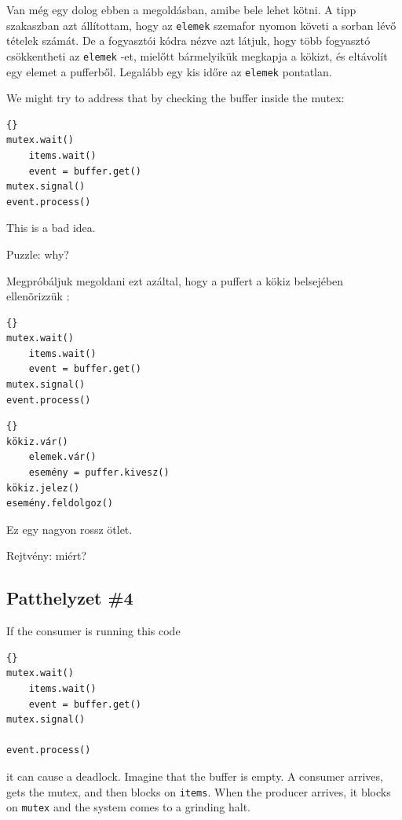 \documentclass{book}
\newcommand{\clearemptydoublepage}{\newpage\cleardoublepage}
\begin{document}
Van még egy dolog ebben a megoldásban, amibe bele lehet kötni.
A tipp szakaszban azt állítottam, hogy az {\tt elemek} szemafor nyomon követi a sorban lévő tételek számát.
De a fogyasztói kódra nézve azt látjuk, hogy több fogyasztó
csökkentheti az {\tt elemek} -et, mielőtt bármelyikük megkapja a kökizt,
és eltávolít egy elemet a pufferből. Legalább egy kis időre az {\tt elemek} pontatlan.

We might try to address that by checking the buffer inside the
mutex:

\begin{lstlisting}[title={Broken consumer solution}]{}
mutex.wait()
    items.wait()
    event = buffer.get()
mutex.signal()
event.process()
\end{lstlisting}

This is a bad idea.

Puzzle: why?

Megpróbáljuk megoldani ezt azáltal, hogy a puffert a kökiz belsejében ellenõrizzük :

\begin{lstlisting}[title={Broken consumer solution}]{}
mutex.wait()
    items.wait()
    event = buffer.get()
mutex.signal()
event.process()
\end{lstlisting}

\begin{lstlisting}[title={Elrontott fogyasztó megoldás}]{}
kökiz.vár()
    elemek.vár()
    esemény = puffer.kivesz()
kökiz.jelez()
esemény.feldolgoz()
\end{lstlisting}

Ez egy nagyon rossz ötlet.

Rejtvény: miért?


\clearemptydoublepage
\subsection{Patthelyzet \#4}

If the consumer is running this code

\begin{lstlisting}[title={Broken consumer solution}]{}
mutex.wait()
    items.wait()
    event = buffer.get()
mutex.signal()

event.process()
\end{lstlisting}
%
it can cause a deadlock.  Imagine that the buffer is empty.
A consumer arrives, gets the mutex, and then blocks on
{\tt items}.  When the producer arrives, it blocks on
{\tt mutex} and the system comes to a grinding halt.
\end{document}
